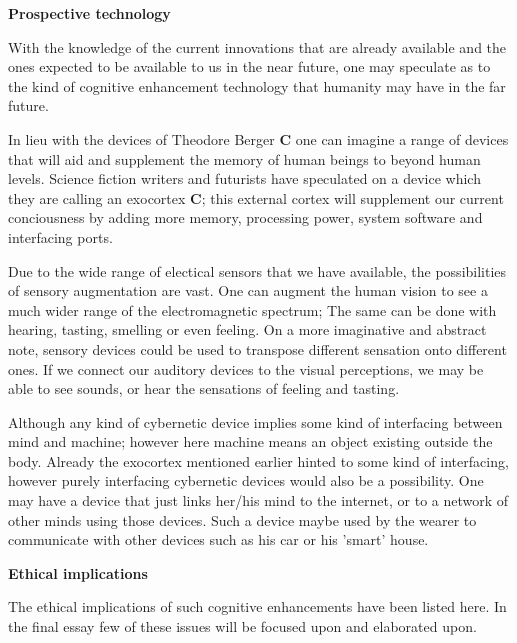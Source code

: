 {\bf Prospective technology}

With the knowledge of the current innovations that are already available and the ones expected to be available to us in the near future, one may speculate as to the kind of cognitive enhancement technology that humanity may have in the far future.

In lieu with the devices of Theodore Berger {\bf C} one can imagine a range of devices that will aid and supplement the memory of human beings to beyond human levels. Science fiction writers and futurists have speculated on a device which they are calling an exocortex {\bf C}; this external cortex will supplement our current conciousness by adding more memory, processing power, system software and interfacing ports.

Due to the wide range of electical sensors that we have available, the possibilities of sensory augmentation are vast. One can augment the human vision to see a much wider range of the electromagnetic spectrum; The same can be done with hearing, tasting, smelling or even feeling. On a more imaginative and abstract note, sensory devices could be used to transpose different sensation onto different ones. If we connect our auditory devices to the visual perceptions, we may be able to see sounds, or hear the sensations of feeling and tasting.

Although any kind of cybernetic device implies some kind of interfacing between mind and machine; however here machine means an object existing outside the body. Already the exocortex mentioned earlier hinted to some kind of interfacing, however purely interfacing cybernetic devices would also be a possibility. One may have a device that just links her/his mind to the internet, or to a network of other minds using those devices. Such a device maybe used by the wearer to communicate with other devices such as his car or his 'smart' house.

{\bf Ethical implications}

The ethical implications of such cognitive enhancements have been listed here. In the final essay few of these issues will be focused upon and elaborated upon.

